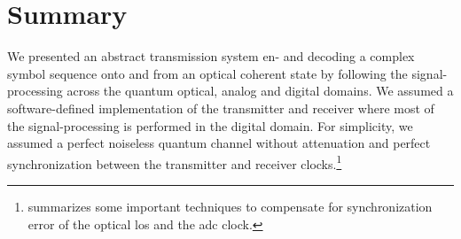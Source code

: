 \section*{Summary}

We presented an abstract transmission system en- and decoding a complex symbol sequence onto and from an optical coherent state by following the signal-processing across the quantum optical, analog and digital domains.
We assumed a software-defined implementation of the transmitter and receiver where most of the signal-processing is performed in the digital domain.
For simplicity, we assumed a perfect noiseless quantum channel without attenuation and perfect synchronization between the transmitter and receiver clocks.\footnote{ summarizes some important techniques to compensate for synchronization error of the optical \gls{lo}s and the \gls{adc} clock.}

